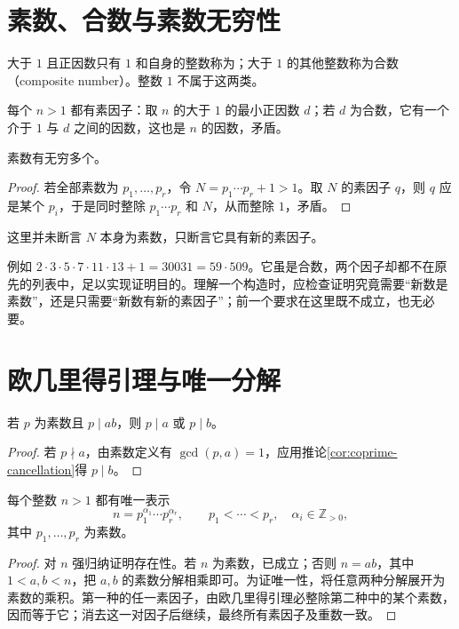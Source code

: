 \documentclass[UTF8,12pt,a4paper,fontset=fandol]{ctexbook}
\begin{document}
\section{素数、合数与素数无穷性}

\begin{definition}
大于 $1$ 且正因数只有 $1$ 和自身的整数称为；大于 $1$ 的其他整数称为合数（composite number）。整数 $1$ 不属于这两类。
\end{definition}

每个 $n>1$ 都有素因子：取 $n$ 的大于 $1$ 的最小正因数 $d$；若 $d$ 为合数，它有一个介于 $1$ 与 $d$ 之间的因数，这也是 $n$ 的因数，矛盾。

\begin{theorem}[素数无穷性]
素数有无穷多个。
\end{theorem}
\begin{proof}
若全部素数为 $p_1,\ldots,p_r$，令 $N=p_1\cdots p_r+1>1$。取 $N$ 的素因子 $q$，则 $q$ 应是某个 $p_i$，于是同时整除 $p_1\cdots p_r$ 和 $N$，从而整除 $1$，矛盾。
\end{proof}

这里并未断言 $N$ 本身为素数，只断言它具有新的素因子。

例如 $2\cdot3\cdot5\cdot7\cdot11\cdot13+1=30031=59\cdot509$。它虽是合数，两个因子却都不在原先的列表中，足以实现证明目的。理解一个构造时，应检查证明究竟需要“新数是素数”，还是只需要“新数有新的素因子”；前一个要求在这里既不成立，也无必要。

\section{欧几里得引理与唯一分解}

\begin{lemma}
\label{lem:euclid-prime}
若 $p$ 为素数且 $p\mid ab$，则 $p\mid a$ 或 $p\mid b$。
\end{lemma}
\begin{proof}
若 $p\nmid a$，由素数定义有 $\gcd(p,a)=1$，应用推论\ref{cor:coprime-cancellation}得 $p\mid b$。
\end{proof}

\begin{theorem}
\label{thm:unique-factorization}
每个整数 $n>1$ 都有唯一表示
\begin{equation}
 n=p_1^{\alpha_1}\cdots p_r^{\alpha_r},\qquad
 p_1<\cdots<p_r,\quad \alpha_i\in\mathbb Z_{>0},
 \label{eq:prime-factorization}
\end{equation}
其中 $p_1,\ldots,p_r$ 为素数。
\end{theorem}
\begin{proof}
对 $n$ 强归纳证明存在性。若 $n$ 为素数，已成立；否则 $n=ab$，其中 $1<a,b<n$，把 $a,b$ 的素数分解相乘即可。为证唯一性，将任意两种分解展开为素数的乘积。第一种的任一素因子，由欧几里得引理必整除第二种中的某个素数，因而等于它；消去这一对因子后继续，最终所有素因子及重数一致。
\end{proof}
\end{document}
